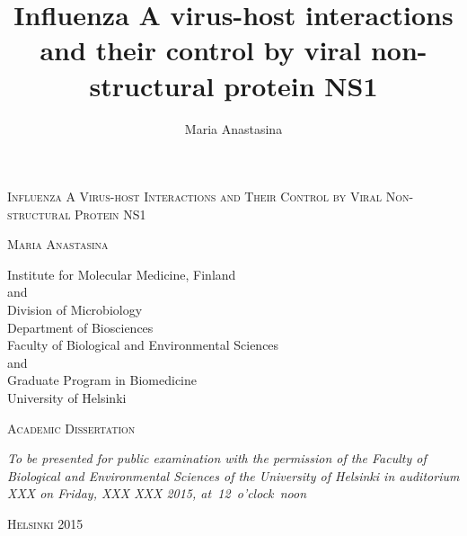 \documentclass[a4paper,12pt]{article} %
\title{Influenza A virus-host interactions \\ and their control by viral non-structural protein NS1}
\author{Maria Anastasina}
\begin{document}

\begin{titlepage}
	\begin{center}
		
		\vspace*{1.5 cm}	
	
		\LARGE \textsc{Influenza A Virus-host Interactions and Their Control by Viral Non-structural Protein NS1}
		
		\vspace{2 cm}
		
		\Large \textsc{Maria Anastasina}
		
		\vspace{2 cm}
		
		\large Institute for Molecular Medicine, Finland \\
		and\\
		Division of Microbiology \\
		Department of Biosciences \\
		Faculty of Biological and Environmental Sciences\\
		and\\
		Graduate Program in Biomedicine\\
		University of Helsinki
		
		\vspace{2.5 cm}
		
		\large \textsc{Academic Dissertation}
		
		\vspace{1 cm}		
		
		\textit{To be presented for public examination with the permission of the Faculty of Biological and Environmental Sciences of the University of Helsinki in auditorium XXX on Friday, XXX XXX 2015, at~12~o'clock~noon}
		
		\vspace{1.5 cm}
		\large \textsc{Helsinki 2015}
	\end{center}
\end{titlepage}

\newpage
\thispagestyle{empty}
\end{document}
